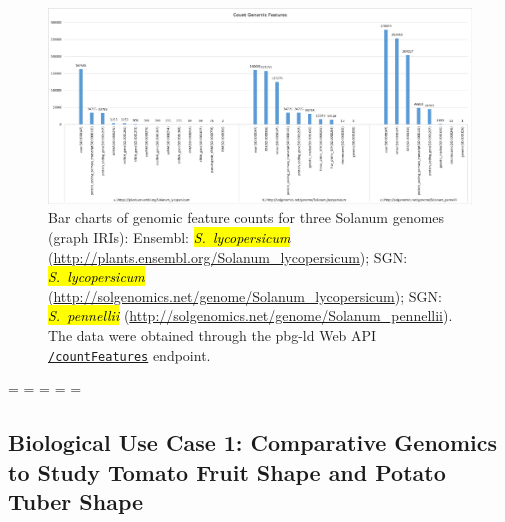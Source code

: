 \documentclass[applsci,article,accept,moreauthors,pdftex]{Definitions/mdpi}
\begin{document}
{%
\begin{figure}[H]
\centering
\includegraphics[scale=0.8]{Figure5.pdf}
\caption{Bar charts of genomic feature counts for three Solanum genomes (graph IRIs):
Ensembl: \emph{\hl{S.~lycopersicum} %
} (\url{http://plants.ensembl.org/Solanum_lycopersicum});
SGN:  \emph{\hl{S.~lycopersicum}} (\url{http://solgenomics.net/genome/Solanum_lycopersicum});
SGN: \emph{\hl{S.~pennellii}} (\url{http://solgenomics.net/genome/Solanum_pennellii}). {The data were obtained through the pbg-ld Web API}
\href{http://localhost:8088/api-local/\#/Count\%20genomic\%20features/get_countFeatures}{\texttt{/countFeatures}} endpoint.} %
\label{Figure5}
\end{figure}

\newpage
\restoregeometry
\paperwidth=\pdfpageheight
\paperheight=\pdfpagewidth
\pdfpageheight=\paperheight
\pdfpagewidth=\paperwidth
\headwidth=\textwidth

\subsection{Biological Use Case 1: Comparative Genomics to Study Tomato Fruit Shape and Potato Tuber Shape}

}
\end{document}

